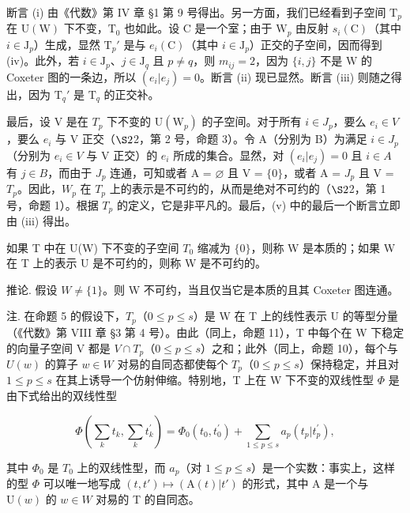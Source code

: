 断言 (i) 由《代数》第 IV 章 §1 第 9 号得出。另一方面，我们已经看到子空间 \(\mathrm{T}_p\) 在 \(\mathrm{U}(\mathrm{W})\) 下不变，\(\mathrm{T}_0\) 也如此。设 \(\mathrm{C}\) 是一个室；由于 \(\mathrm{W}_p\) 由反射 \(s_i(\mathrm{C})\)（其中 \(i \in \mathrm{J}_p\)）生成，显然 \(\mathrm{T}_p'\) 是与 \(e_i(\mathrm{C})\)（其中 \(i \in \mathrm{J}_p\)）正交的子空间，因而得到 (iv)。此外，若 \(i \in \mathrm{J}_p\)、\(j \in \mathrm{J}_q\) 且 \(p \neq q\)，则 \(m_{ij} = 2\)，因为 \(\{i,j\}\) 不是 \(\mathrm{W}\) 的 Coxeter 图的一条边，所以 \((e_i|e_j) = 0\)。断言 (ii) 现已显然。断言 (iii) 则随之得出，因为 \(\mathrm{T}_q'\) 是 \(\mathrm{T}_q\) 的正交补。

最后，设 V 是在 \(T_{p}\) 下不变的 \(\mathrm{U}(\mathrm{W}_{p})\) 的子空间。对于所有 \(i \in J_{p}\)，要么 \(e_{i} \in V\)，要么 \(e_{i}\) 与 V 正交（\(\S2\)2，第 2 号，命题 3）。令 A（分别为 B）为满足 \(i \in J_{p}\)（分别为 \(e_{i} \in V\) 与 V 正交）的 \(e_{i}\) 所成的集合。显然，对 \((e_{i}|e_{j}) = 0\) 且 \(i \in A\) 有 \(j \in B\)，而由于 \(J_{p}\) 连通，可知或者 A = \(\varnothing\) 且 V = \(\{0\}\)，或者 A = \(J_{p}\) 且 V = \(T_{p}\)。因此，\(W_{p}\) 在 \(T_{p}\) 上的表示是不可约的，从而是绝对不可约的（\(\S2\)2，第 1 号，命题 1）。根据 \(T_{p}\) 的定义，它是非平凡的。最后，(v) 中的最后一个断言立即由 (iii) 得出。

如果 T 中在 U(W) 下不变的子空间 \(T_{0}\) 缩减为 \(\{0\}\)，则称 W 是本质的；如果 W 在 T 上的表示 U 是不可约的，则称 W 是不可约的。

推论. 假设 \(W \neq \{1\}\)。则 W 不可约，当且仅当它是本质的且其 Coxeter 图连通。

注. 在命题 5 的假设下，\(T_{p}\)（\(0 \leqslant p \leqslant s\)）是 W 在 T 上的线性表示 U 的等型分量（《代数》第 VIII 章 §3 第 4 号）。由此（同上，命题 11），T 中每个在 W 下稳定的向量子空间 V 都是 \(V \cap T_{p}\)（\(0 \leqslant p \leqslant s\)）之和；此外（同上，命题 10），每个与 \(U(w)\) 的算子 \(w \in W\) 对易的自同态都使每个 \(T_{p}\)（\(0 \leqslant p \leqslant s\)）保持稳定，并且对 \(1 \leqslant p \leqslant s\) 在其上诱导一个仿射伸缩。特别地，T 上在 W 下不变的双线性型 \(\Phi\) 是由下式给出的双线性型

\[
\varPhi \left(\sum_ {k} t _ {k}, \sum_ {k} t _ {k} ^ {\prime}\right) = \varPhi_ {0} (t _ {0}, t _ {0} ^ {\prime}) + \sum_ {1 \leqslant p \leqslant s} a _ {p} (t _ {p} | t _ {p} ^ {\prime}),
\]

其中 \(\Phi_{0}\) 是 \(T_{0}\) 上的双线性型，而 \(a_{p}\)（对 \(1 \leqslant p \leqslant s\)）是一个实数：事实上，这样的型 \(\Phi\) 可以唯一地写成 \((t, t') \mapsto (\mathrm{A}(t)|t')\) 的形式，其中 A 是一个与 \(\mathrm{U}(w)\) 的 \(w \in W\) 对易的 T 的自同态。
\relax{}
